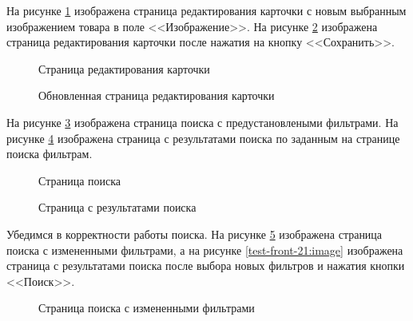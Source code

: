 На рисунке \ref{test-front5:image} изображена страница редактирования карточки с новым выбранным изображением товара в поле <<Изображение>>. На рисунке \ref{test-front6:image} изображена страница редактирования карточки после нажатия на кнопку <<Сохранить>>.

\begin{figure}[H] %
\caption{Страница редактирования карточки}
\label{test-front5:image}
\end{figure}

\begin{figure}[H] %
\caption{Обновленная страница редактирования карточки}
\label{test-front6:image}
\end{figure}

На рисунке \ref{test-front7:image} изображена страница поиска с предустановлеными фильтрами. На рисунке \ref{test-front8:image} изображена страница с результатами поиска по заданным на странице поиска фильтрам.

\begin{figure}[H] %
\caption{Страница поиска}
\label{test-front7:image}
\end{figure}

\begin{figure}[H] %
\caption{Страница с результатами поиска}
\label{test-front8:image}
\end{figure}

Убедимся в корректности работы поиска. На рисунке \ref{test-front-20:image} изображена страница поиска с измененными фильтрами, а на рисунке \ref{test-front-21:image} изображена страница с результатами поиска после выбора новых фильтров и нажатия кнопки <<Поиск>>.

\begin{figure}[H] %
\caption{Страница поиска с измененными фильтрами}
\label{test-front-20:image}
\end{figure}

